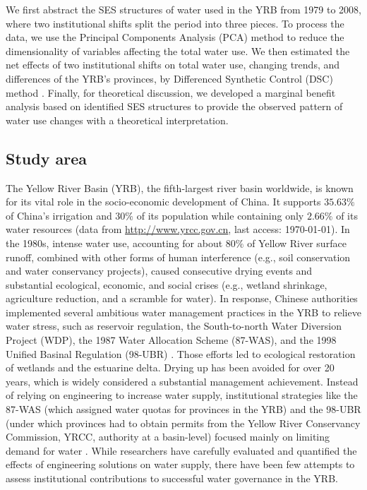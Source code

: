 \documentclass[default, sn-standardnature]{sn-jnl}
\begin{document}
We first abstract the SES structures of water used in the YRB from 1979 to 2008, where two institutional shifts split the period into three pieces.
To process the data, we use the Principal Components Analysis (PCA) method to reduce the dimensionality of variables affecting the total water use.
We then estimated the net effects of two institutional shifts on total water use, changing trends, and differences of the YRB's provinces, by Differenced Synthetic Control (DSC) method \cite{arkhangelsky2021}.
Finally, for theoretical discussion, we developed a marginal benefit analysis based on identified SES structures to provide the observed pattern of water use changes with a theoretical interpretation.

\subsection{Study area}\label{sec:yrb}

The Yellow River Basin (YRB), the fifth-largest river basin worldwide, is known for its vital role in the socio-economic development of China.
It supports $35.63\%$ of China's irrigation and $30\%$ of its population while containing only $2.66\%$ of its water resources (data from \href{http://www.yrcc.gov.cn}{http://www.yrcc.gov.cn}, last access: \today).
In the 1980s, intense water use, accounting for about $80\%$ of Yellow River surface runoff, combined with other forms of human interference (e.g., soil conservation and water conservancy projects), caused consecutive drying events and substantial ecological, economic, and social crises (e.g., wetland shrinkage, agriculture reduction, and a scramble for water).
In response, Chinese authorities implemented several ambitious water management practices in the YRB to relieve water stress, such as reservoir regulation, the South-to-north Water Diversion Project (WDP), the 1987 Water Allocation Scheme (87-WAS), and the 1998 Unified Basinal Regulation (98-UBR) \cite{long2020, wang2019d}.
Those efforts led to ecological restoration of wetlands and the estuarine delta. Drying up has been avoided for over 20 years, which is widely considered a substantial management achievement.
Instead of relying on engineering to increase water supply, institutional strategies like the 87-WAS (which assigned water quotas for provinces in the YRB) and the 98-UBR (under which provinces had to obtain permits from the Yellow River Conservancy Commission, YRCC, authority at a basin-level) focused mainly on limiting demand for water \cite{bouckaert2022, speed2013}.
While researchers have carefully evaluated and quantified the effects of engineering solutions on water supply\cite{long2020}, there have been few attempts to assess institutional contributions to successful water governance in the YRB.
\end{document}
